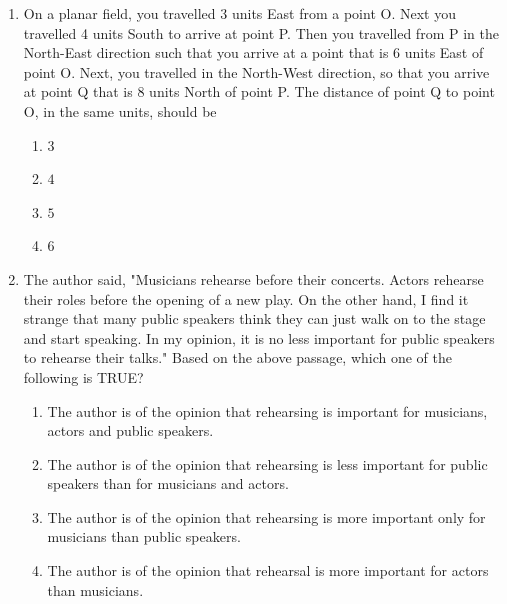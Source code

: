 \documentclass[journal,12pt,onecolumn]{article}
\theoremstyle{remark}
\begin{document}
\begin{enumerate}
\hfill{}

\begin{multicols}{2}
\begin{enumerate}
    \item $6$
    \item $9$
    \item $18$
    \item $24$
\end{enumerate}
\end{multicols}

\textbf{Q.6 - Q.10 Multiple Choice Question carry two mark each}

\item On a planar field, you travelled 3 units East from a point O. Next you travelled 4 units South to arrive at point P. Then you travelled from P in the North-East direction such that you arrive at a point that is 6 units East of point O. Next, you travelled in the North-West direction, so that you arrive at point Q that is 8 units North of point P.
The distance of point Q to point O, in the same units, should be \underline{\hspace{2cm}}

\hfill{}

\begin{multicols}{2}
\begin{enumerate}
    \item $3$
    \item $4$
    \item $5$
    \item $6$
\end{enumerate}
\end{multicols}

\item The author said, "Musicians rehearse before their concerts. Actors rehearse their roles before the opening of a new play. On the other hand, I find it strange that many public speakers think they can just walk on to the stage and start speaking. In my opinion, it is no less important for public speakers to rehearse their talks."
Based on the above passage, which one of the following is TRUE?

\hfill{}

\begin{enumerate}
    \item The author is of the opinion that rehearsing is important for musicians, actors and public speakers.
    \item The author is of the opinion that rehearsing is less important for public speakers than for musicians and actors.
    \item The author is of the opinion that rehearsing is more important only for musicians than public speakers.
    \item The author is of the opinion that rehearsal is more important for actors than musicians.
\end{enumerate}


\end{enumerate}
\end{document}
